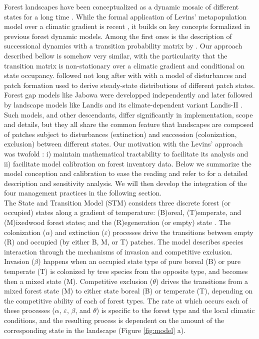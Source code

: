 Forest landscapes have been conceptualized as a dynamic mosaic of
different states for a long time \citep{PICKETT1985}. While the formal
application of Levins' metapopulation model over a climatic gradient is
recent \citep{Talluto2017}, it builds on key concepts formalized in
previous forest dynamic models. Among the first ones is the description
of successional dynamics with a transition probability matrix by
\citet{horn1971adaptive}. Our approach described bellow is somehow very
similar, with the particularity that the transition matrix is
non-stationary over a climatic gradient and conditional on state
occupancy. \citet{Levin1974} followed not long after with with a model
of disturbances and patch formation used to derive steady-state
distributions of different patch states. Forest gap models like Jabowa
were developped independently \citep{Botkin1972} and later followed by
landscape models like Landis \citep{Mladenoff1996} and its
climate-dependent variant Landis-II \citep{Scheller2004}. Such models,
and other descendants, differ significantly in implementation, scope and
details, but they all share the common feature that landscapes are
composed of patches subject to disturbances (extinction) and succession
(colonization, exclusion) between different states. Our motivation with
the Levins' approach was twofold : i) maintain mathematical tractability
to facilitate its analysis and ii) facilitate model calibration on
forest inventory data. Below we summarize the model conception and
calibration to ease the reading and refer to \citet{Vissault2020} for a
detailed description and sensitivity analysis. We will then develop the
integration of the four management practices in the following section.\\

The State and Transition Model (STM) considers three discrete forest (or
occupied) states along a gradient of temperature: (B)oreal, (T)emperate,
and (M)ixedwood forest states; and the (R)egeneration (or empty) state
\citep{Vissault2020}. The colonization (\(\alpha\)) and extinction
(\(\varepsilon\)) processes drive the transitions between empty (R) and
occupied (by either B, M, or T) patches. The model describes species
interaction through the mechanisms of invasion and competitive
exclusion. Invasion (\(\beta\)) happens when an occupied state type of
pure boreal (B) or pure temperate (T) is colonized by tree species from
the opposite type, and becomes then a mixed state (M). Competitive
exclusion (\(\theta\)) drives the transitions from a mixed forest state
(M) to either state boreal (B) or temperate (T), depending on the
competitive ability of each of forest types. The rate at which occurs
each of these processes (\(\alpha\), \(\varepsilon\), \(\beta\), and
\(\theta\)) is specific to the forest type and the local climatic
conditions, and the resulting process is dependent on the amount of the
corresponding state in the landscape (Figure \ref{fig:model} a).\\

